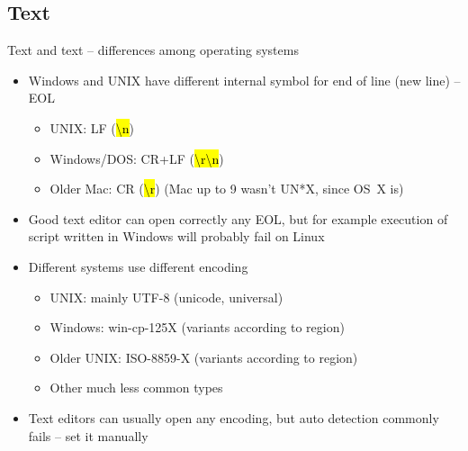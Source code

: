 \documentclass[compress, ucs, xelatex, 11pt, xcolor=svgnames,
  hyperref={
    bookmarks=true,
    unicode=true,
    colorlinks=true,
    pdftitle={Linux, command line and MetaCentrum},
    plainpages=false,
    pdfauthor={Vojtech Zeisek},
    pdfsubject={Course about use of Linux command line, writing shell scripts and using MetaCentrum of CESNET},
    pdfcreator={XeLaTeX},
    pdfkeywords={Linux, GNU, BASH, shell, command line, MetaCentrum},
    linkcolor=DarkRed,
    anchorcolor=DarkBlue,
    citecolor=Indigo,
    filecolor=NavyBlue,
    menucolor=DarkMagenta,
    urlcolor=DarkBlue,
    pdftex},
  url={hyphens, lowtilde} %
  ]{beamer}
\renewcommand{\texttt}[1]{\hl{\ttfamily #1}}
\begin{document}
\subsection{Text}

\begin{frame}{Text and text -- differences among operating systems}
\begin{itemize}
  \item Windows and UNIX have different internal symbol for end of line (new line) -- EOL
  \begin{itemize}
    \item UNIX: LF (\texttt{\textbackslash n})
    \item Windows/DOS: CR+LF (\texttt{\textbackslash r\textbackslash n})
    \item Older Mac: CR (\texttt{\textbackslash r}) (Mac up to 9 wasn't UN*X, since OS~X is)
  \end{itemize}
  \item Good text editor can open correctly any EOL, but for example execution of script written in Windows will probably fail on Linux
  \item Different systems use different encoding
  \begin{itemize}
    \item UNIX: mainly UTF-8 (unicode, universal)
    \item Windows: win-cp-125X (variants according to region)
    \item Older UNIX: ISO-8859-X (variants according to region)
    \item Other much less common types
  \end{itemize}
  \item Text editors can usually open any encoding, but auto detection commonly fails -- set it manually
\end{itemize}
\end{frame}
\end{document}
